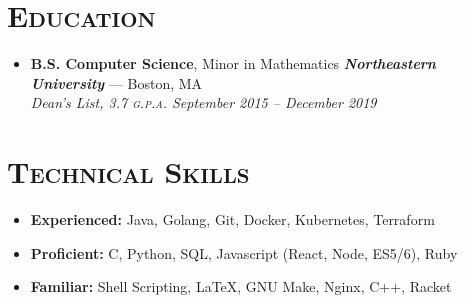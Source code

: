 \documentclass{article}
\begin{document}
\section*{\textsc{Education}}
\begin{itemize}[label={},leftmargin=*]
  \item \textbf{B.S. Computer Science}, Minor in Mathematics \hfill \textit{\textbf{Northeastern University}} --- Boston, MA \\
  \em{Dean's List}, 3.7 \textsc{g.p.a.}  \hfill \em{\textit{September 2015 -- December 2019}}
\end{itemize}

\section*{\textsc{Technical Skills}}
\begin{itemize}[label={},leftmargin=*]
  \item \textbf{Experienced:} Java, Golang, Git, Docker, Kubernetes, Terraform
  \item \textbf{Proficient:} C, Python, SQL, Javascript (React, Node, ES5/6), Ruby
  \item \textbf{Familiar:} Shell Scripting, LaTeX, GNU Make, Nginx, C++, Racket
\end{itemize}
\end{document}
